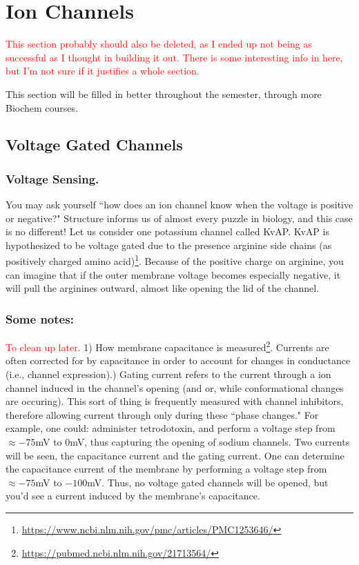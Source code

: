 \section{Ion Channels}

\textcolor{red}{This section probably should also be deleted, as I ended up not being as successful as I thought in building it out. There is some interesting info in here, but I'm not sure if it justifies a whole section.}\newline

This section will be filled in better throughout the semester, through more Biochem courses. 


\subsection{Voltage Gated Channels}


\subsubsection{Voltage Sensing.}
You may ask yourself ``how does an ion channel know when the voltage is positive or negative?" Structure informs us of almost every puzzle in biology, and this case is no different! Let us consider one potassium channel called KvAP. KvAP is hypothesized to be voltage gated due to the presence arginine side chains (as positively charged amino acid)\footnote{\url{https://www.ncbi.nlm.nih.gov/pmc/articles/PMC1253646/}}. Because of the positive charge on arginine, you can imagine that if the outer membrane voltage becomes especially negative, it will pull the arginines outward, almost like opening the lid of the channel.



\subsubsection{Some notes:}
\textcolor{red}{To clean up later.}
1) How membrane capacitance is measured\footnote{\url{https://pubmed.ncbi.nlm.nih.gov/21713564/}}. Currents are often corrected for by capacitance in order to account for changes in conductance (i.e., channel expression).) Gating current refers to the current through a ion channel induced in the channel's opening (and or, while conformational changes are occuring). This sort of thing is frequently measured with channel inhibitors, therefore allowing current through only during these ``phase changes." For example, one could: administer tetrodotoxin, and perform a voltage step from $\approx -75$mV to 0mV, thus capturing the opening of sodium channels. Two currents will be seen, the capacitance current and the gating current. One can determine the capacitance current of the membrane by performing a voltage step from $\approx -75$mV to $-100$mV. Thus, no voltage gated channels will be opened, but you'd see a current induced by the membrane's capacitance.



